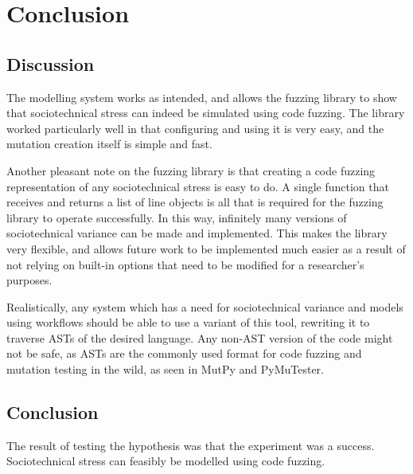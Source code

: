 \chapter{Conclusion}
\label{conclusion}

\section{Discussion}
The modelling system works as intended, and allows the fuzzing library to show that sociotechnical stress can indeed be simulated using code fuzzing. The library worked particularly well in that configuring and using it is very easy, and the mutation creation itself is simple and fast. \par

Another pleasant note on the fuzzing library is that creating a code fuzzing representation of any sociotechnical stress is easy to do. A single function that receives and returns a list of line objects is all that is required for the fuzzing library to operate successfully. In this way, infinitely many versions of sociotechnical variance can be made and implemented. This makes the library very flexible, and allows future work to be implemented much easier as a result of not relying on built-in options that need to be modified for a researcher's purposes. \par

Realistically, any system which has a need for sociotechnical variance and models using workflows should be able to use a variant of this tool, rewriting it to traverse ASTs of the desired language. Any non-AST version of the code might not be safe, as ASTs are the commonly used format for code fuzzing and mutation testing in the wild, as seen in MutPy\cite{MutPy26:online} and PyMuTester\cite{GitHu12:online}. \par

\section{Conclusion}
The result of testing the hypothesis was that the experiment was a success. Sociotechnical stress can feasibly be modelled using code fuzzing. \par

